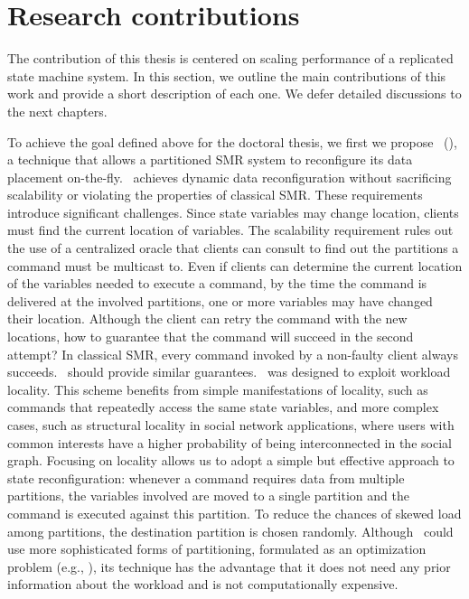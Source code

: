 \section{Research contributions}
\label{sec:contribution}


The contribution of this thesis is centered on scaling performance of a
replicated state machine system. In this section, we outline the main
contributions of this work and provide a short description of each one. We defer
detailed discussions to the next chapters.


To achieve the goal defined above for the doctoral thesis, we first we propose
\textbf{\dssmrlong}\ (\dssmr), a technique that allows a partitioned SMR system
to reconfigure its data placement on-the-fly. \dssmr\ achieves dynamic data
reconfiguration without sacrificing scalability or violating the properties of
classical SMR. These requirements introduce significant challenges. Since state
variables may change location, clients must find the current location of
variables. The scalability requirement rules out the use of a centralized oracle
that clients can consult to find out the partitions a command must be multicast
to. Even if clients can determine the current location of the variables needed
to execute a command, by the time the command is delivered at the involved
partitions, one or more variables may have changed their location. Although the
client can retry the command with the new locations, how to guarantee that the
command will succeed in the second attempt? In classical SMR, every command
invoked by a non-faulty client always succeeds. \dssmr\ should provide similar
guarantees. \dssmr\ was designed to exploit workload locality. This scheme
benefits from simple manifestations of locality, such as commands that
repeatedly access the same state variables, and more complex cases,
such as structural locality in social network applications, where users with
common interests have a higher probability of being interconnected in the social
graph. Focusing on locality allows us to adopt a simple but effective approach
to state reconfiguration: whenever a command requires data from multiple
partitions, the variables involved are moved to a single partition and the
command is executed against this partition. To reduce the chances of skewed load
among partitions, the destination partition is chosen randomly. Although \dssmr\
could use more sophisticated forms of partitioning, formulated as an
optimization problem (e.g., \cite{curino2010sch,taft2014est}), its technique has
the advantage that it does not need any prior information about the workload and
is not computationally expensive.

